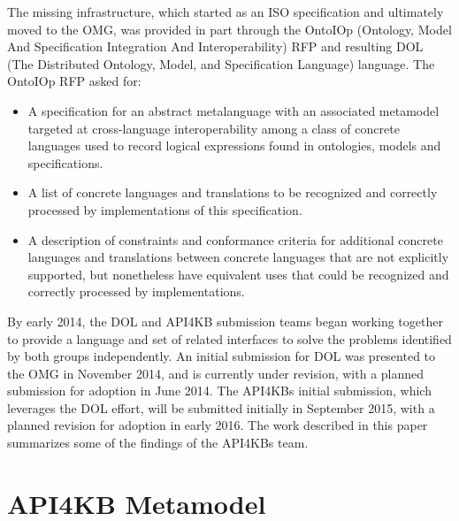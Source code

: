 \documentclass[runningheads]{llncs}
\begin{document}
The missing infrastructure, which started as an ISO specification and ultimately moved to the OMG, was provided in part through the OntoIOp (Ontology, Model And Specification Integration And Interoperability) RFP \cite{OntoIOp} and resulting DOL (The Distributed Ontology,
Model, and Specification
Language) language. The OntoIOp RFP asked for:
\begin {itemize}
\item A specification for an abstract metalanguage with an associated metamodel targeted at cross-language interoperability among a class of concrete languages used to record logical expressions found in ontologies, models and specifications.
\item A list of concrete languages and translations to be recognized and correctly processed by implementations of this specification. 
\item A description of constraints and conformance criteria for additional concrete languages and translations between concrete languages that are not explicitly supported, but nonetheless have equivalent uses that could be recognized and correctly processed by implementations.
\end{itemize}

By early 2014, the DOL and API4KB submission teams began working together to provide a language and set of related interfaces to solve the problems identified by both groups independently. An initial submission for DOL \cite{DOL} was presented to the OMG in November 2014, and is currently under revision, with a planned submission for adoption in June 2014.  The API4KBs initial submission, which leverages the DOL effort, will be submitted initially in September 2015, with a planned revision for adoption in early 2016.  The work described in this paper summarizes some of the findings of the API4KBs team.




\section{API4KB Metamodel}
\label{sec:metamodel}
\end{document}

